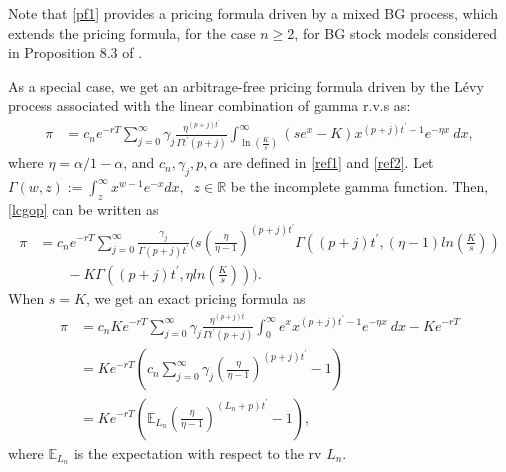 \documentclass[12pt, a4paper,reqno]{amsart}
\theoremstyle{definition}
\theoremstyle{myremark}
\numberwithin{equation}{section}
\begin{document}
\noindent
Note that \eqref{pf1} provides a pricing formula driven by a mixed BG process, which extends the pricing formula, for the case $n\geq 2$, for BG stock models considered in Proposition 8.3 of \cite{bilateral0}.

\noindent
 As a special case, we get an arbitrage-free pricing formula driven by the L\'evy process associated with the linear combination of gamma r.v.s as:
\begin{align}\label{lcgop}
\pi
&=c_ne^{-rT}\sum_{j=0}^{\infty}\gamma_j \frac{\eta^{(p+j)t^\prime }  }{\Gamma t^\prime (p+j)}\int_{\ln\left(\frac{K}{s}\right)}^{\infty} (se^x - K)x^{(p+j)t^\prime-1}e^{-\eta x}~ dx,
\end{align}
\noindent
where $\eta=\alpha/1-\alpha$, and $c_n,\gamma_j,p, \alpha$ are defined in \eqref{ref1} and \eqref{ref2}. Let $\Gamma(w,z):=\int_{z}^{\infty}x^{w-1}e^{-x}dx,$ $~z\in \mathbb{R}$ be the incomplete gamma function. Then, \eqref{lcgop} can be written as
\begin{align*}
\pi
&=c_ne^{-rT}\sum_{j=0}^{\infty} \frac{\gamma_j   }{\Gamma  (p+j)t^\prime}\bigg( s \left(\frac{\eta}{\eta -1}\right)^{(p+j)t^\prime}  \Gamma \left((p+j)t^\prime, (\eta-1)ln\left(\frac{K}{s}\right)\right) \\
&\quad\quad-  K\Gamma \left((p+j)t^\prime, \eta ln\left(\frac{K}{s}\right)\right) \bigg).
\end{align*}
\noindent
 When $s=K$, we get an exact pricing formula as
\begin{align*}
\pi&=c_nKe^{-rT}\sum_{j=0}^{\infty}\gamma_j \frac{\eta^{(p+j)t^\prime }  }{\Gamma t^\prime (p+j)}\int_{0}^{\infty}e^xx^{(p+j)t^\prime-1}e^{-\eta x}~ dx -Ke^{-rT}\\
&=Ke^{-rT}\left(c_n\sum_{j=0}^{\infty}\gamma_j\left( \frac{\eta}{\eta -1} \right)^{(p+j)t^\prime }-1\right)\\
&=Ke^{-rT}\left( \mathbb{E}_{L_n} \left( \frac{\eta}{\eta -1} \right)^{(L_n+p)t^\prime }-1\right),
\end{align*}
\noindent
where $\mathbb{E}_{L_n}$ is the expectation with respect to the rv $L_n$.
\end{document}
